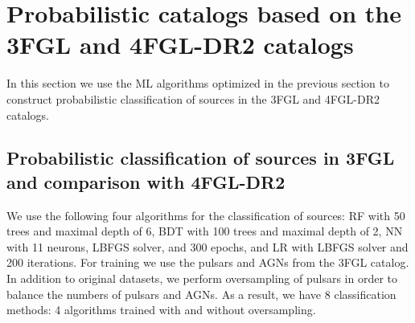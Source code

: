 \section{Probabilistic catalogs based on the 3FGL and 4FGL-DR2 catalogs}

In this section we use the ML algorithms optimized in the previous section to construct probabilistic
classification of sources in the 3FGL and 4FGL-DR2 catalogs.



\subsection{Probabilistic classification of sources in 3FGL and comparison with 4FGL-DR2}


We use the following four algorithms for the classification of sources: RF with 50 trees and maximal depth of 6, BDT with 100 trees and maximal depth of 2, NN with 11 neurons, LBFGS solver, and 300 epochs, and LR with LBFGS solver and 200 iterations. 
For training we use the pulsars and AGNs from the 3FGL catalog. In addition to original datasets, we perform oversampling of pulsars in order to balance the numbers of pulsars and AGNs.
As a result, we have 8 classification methods: 4 algorithms trained with and without oversampling.


\begin{table}[!h]
\centering
\hspace{-0.2cm}
    \vspace{2mm}
    \caption{Testing accuracy of the 4 selected algorithms for classification of 3FGL sources and comparison with associations in the 4FGL-DR2 catalog. 
    ``\_O'' denotes training with oversampling.}
    \label{tab:selected_algs}
\end{table}



